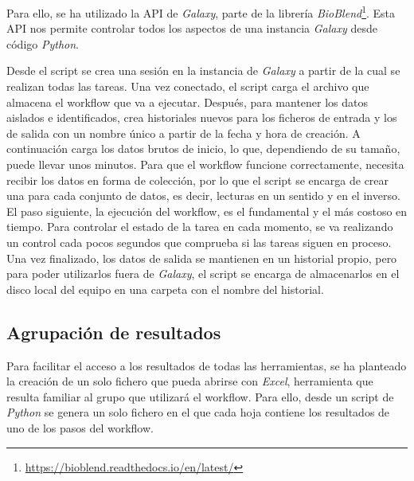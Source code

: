 Para ello, se ha utilizado la API de \textit{Galaxy}, parte de la librería \textit{BioBlend}\footnote{\url{https://bioblend.readthedocs.io/en/latest/}}. Esta API nos permite controlar todos los aspectos de una instancia \textit{Galaxy} desde código \textit{Python}.

Desde el script se crea una sesión en la instancia de \textit{Galaxy} a partir de la cual se realizan todas las tareas. Una vez conectado, el script carga el archivo que almacena el workflow que va a ejecutar. Después, para mantener los datos aislados e identificados, crea historiales nuevos para los ficheros de entrada y los de salida con un nombre único a partir de la fecha y hora de creación. A continuación carga los datos brutos de inicio, lo que, dependiendo de su tamaño, puede llevar unos minutos. Para que el workflow funcione correctamente, necesita recibir los datos en forma de colección, por lo que el script se encarga de crear una para cada conjunto de datos, es decir, lecturas en un sentido y en el inverso. El paso siguiente, la ejecución del workflow, es el fundamental y el más costoso en tiempo. Para controlar el estado de la tarea en cada momento, se va realizando un control cada pocos segundos que comprueba si las tareas siguen en proceso. Una vez finalizado, los datos de salida se mantienen en un historial propio, pero para poder utilizarlos fuera de \textit{Galaxy}, el script se encarga de almacenarlos en el disco local del equipo en una carpeta con el nombre del historial.

\subsection{Agrupación de resultados}
Para facilitar el acceso a los resultados de todas las herramientas, se ha planteado la creación de un solo fichero que pueda abrirse con \textit{Excel}, herramienta que resulta familiar al grupo que utilizará el workflow. Para ello, desde un script de \textit{Python} se genera un solo fichero en el que cada hoja contiene los resultados de uno de los pasos del workflow.




